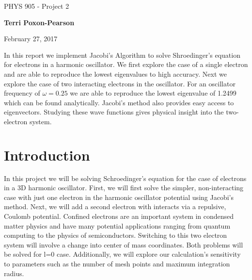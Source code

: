 \documentclass[%
oneside,                 %
final,                   %
10pt]{article}
\begin{document}

\newcommand{\exercisesection}[1]{\subsection*{#1}}






\thispagestyle{empty}

\begin{center}
{\LARGE\bf
\begin{spacing}{1.25}
PHYS 905 - Project 2
\end{spacing}
}
\end{center}


\begin{center}
{\bf Terri Poxon-Pearson}
\end{center}

    

\begin{center}
February 27, 2017
\end{center}

\vspace{1cm}

In this report we implement Jacobi's Algorithm to solve Shroedinger's equation for electrons in a harmonic oscillator.  We first explore the case of a single electron and are able to reproduce the lowest eigenvalues to high accuracy.  Next we explore the case of two interacting electrons in the oscillator.  For an oscillator frequency of $\omega = 0.25$ we are able to reproduce the lowest eigenvalue of 1.2499 which can be found analytically.  Jacobi's method also provides easy access to eigenvectors.  Studying these wave functions gives physical insight into the two-electron system.

\tableofcontents
 
\section{Introduction}
In this project we will be solving Schroedinger's equation for the case of electrons in a 3D harmonic oscillator. First, we will first solve the simpler, non-interacting case with just one electron in the harmonic oscillator potential using Jacobi's method. Next, we will add a second electron with interacts via a repulsive, Coulomb potential.  Confined electrons are an important system in condensed matter physics and have many potential applications ranging from quantum computing to the physics of semiconductors.  Switching to this two electron system will involve a change into center of mass coordinates.  Both problems will be solved for l=0 case.  Additionally, we will explore our calculation's sensitivity to parameters such as the number of mesh points and maximum integration radius.
\end{document}
